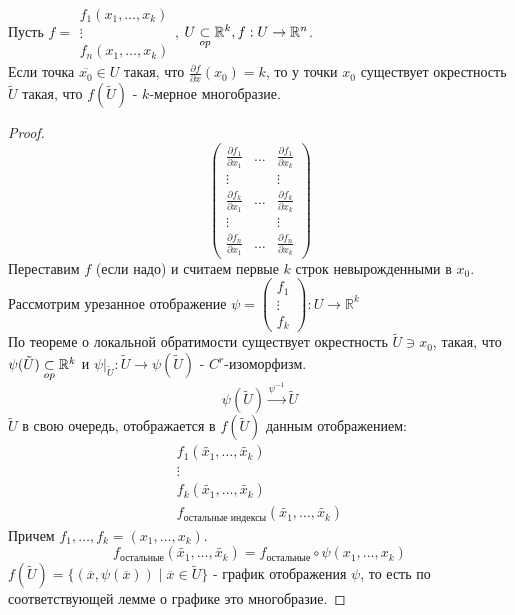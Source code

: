 \begin{lemma*}
    Пусть $f = \begin{array}{c}
        f_1(x_1, \hdots, x_k) \\
        \vdots \\
        f_n(x_1, \hdots, x_k)
    \end{array}$, $U \underset{op}{\subset} \mathbb{R}^k, f: U \to \mathbb{R}^n$.\\
    Если точка $\overline{x_0} \in U$ такая, что $\frac{\partial f}{\partial x}(x_0) = k$, то у точки $x_0$ существует окрестность $\tilde{U}$ такая, что $f(\tilde{U})$ - $k$-мерное многобразие.

    \begin{proof}
        \[\begin{pmatrix}
            \frac{\partial f_1}{\partial x_1} & \hdots & \frac{\partial f_1}{\partial x_k} \\
            \vdots & & \vdots\\
            \frac{\partial f_k}{\partial x_1} & \hdots & \frac{\partial f_k}{\partial x_k} \\
            \vdots & & \vdots\\
            \frac{\partial f_n}{\partial x_1} & \hdots & \frac{\partial f_n}{\partial x_k}
        \end{pmatrix}\]
        Переставим $f$ (если надо) и считаем первые $k$ строк невырожденными в $x_0$.
        Рассмотрим урезанное отображение $\psi = (\begin{array}{c} f_1 \\ \vdots \\ f_k \end{array}): U \to \mathbb{R}^k$\\
        По теореме о локальной обратимости существует окрестность $\tilde{U} \ni x_0$, такая, что 
        $\psi(\tilde{U}) \underset{op}{\subset} \mathbb{R}^k$ и $\psi|_{\tilde{U}}: \tilde{U} \to \psi(\tilde{U})$ - $C^r$-изоморфизм.
        \[\psi(\tilde{U}) \overset{\psi^{-1}}{\to} \tilde{U}\]
        $\tilde{U}$ в свою очередь, отображается в $f(\tilde{U})$ данным отображением:
        \[\begin{array}{c}
            f_1(\tilde{x_1}, \hdots, \tilde{x_k}) \\
            \vdots \\
            f_k(\tilde{x_1}, \hdots, \tilde{x_k}) \\
            f_{\text{остальные индексы}}(\tilde{x_1}, \hdots, \tilde{x_k})
        \end{array}\]
        Причем $f_1, \hdots, f_k = (x_1, \hdots, x_k)$. 
        \[f_{\text{остальные}}(\tilde{x_1}, \hdots, \tilde{x_k}) = f_{\text{остальные}}\circ \psi(x_1, \hdots, x_k)\]
        $f(\tilde{U})= \{(\overline{x}, \psi(\overline{x})) \mid \overline{x} \in \tilde{U}\}$ - график отображения $\psi$, то есть по соответствующей лемме о графике это многобразие.
    \end{proof}
\end{lemma*}

